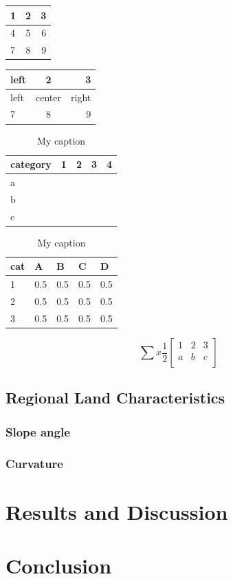 \documentclass[10pt]{article}
\begin{document}
\begin{tabular}{ l | c | r }
  1 & 2 & 3 \\ \hline
  4 & 5 & 6 \\
  7 & 8 & 9 \\
\end{tabular}


\begin{tabular}{ l | c | r }
\hline
  left & 2 & 3 \\ \hline
  left & center & right \\
  7 & 8 & 9 \\
\hline
\end{tabular}

\begin{table}[]
\centering

\label{my-label}
\begin{tabular}{lllll}
category & 1 & 2 & 3 & 4 \\ \hline
a        &   &   &   &   \\
b        &   &   &   &   \\
c        &   &   &   &  
\end{tabular}
\caption{My caption}
\end{table}

\begin{table}[]
\centering
\caption{My caption}
\label{my-label}
\begin{tabular}{lllll}
\hline
cat & A   & B   & C   & D   \\ \hline
1   & 0.5 & 0.5 & 0.5 & 0.5 \\
2   & 0.5 & 0.5 & 0.5 & 0.5 \\
3   & 0.5 & 0.5 & 0.5 & 0.5 \\ \hline
\end{tabular}
\end{table}

\begin{equation}
\sum x \frac{1}{2} \begin{bmatrix}
1 & 2 & 3\\ 
a & b & c\\ 
 &  & 
\end{bmatrix}
\end{equation}



\subsection{Regional Land Characteristics}
\subsubsection{Slope angle}
\subsubsection{Curvature}

\section{Results and Discussion}

\section{Conclusion}


\end{document}
